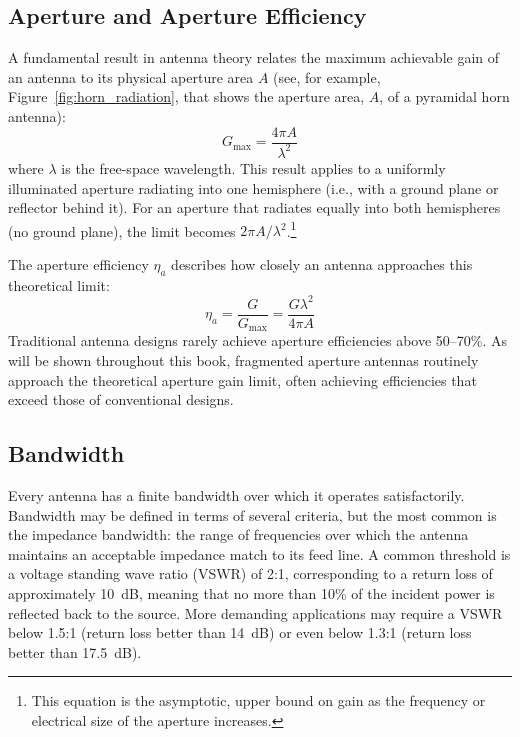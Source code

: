 \subsection{Aperture and Aperture Efficiency}

A fundamental result in antenna theory relates the maximum achievable gain of an antenna to its physical aperture area $A$ (see, for example, Figure~\ref{fig:horn_radiation}, that shows the aperture area, $A$, of a pyramidal horn antenna):
\begin{equation}
\label{eq:apGain}
G_{\text{max}} = \frac{4\pi A}{\lambda^2}
\end{equation}
where $\lambda$ is the free-space wavelength.  This result applies to a uniformly illuminated aperture radiating into one hemisphere (i.e., with a ground plane or reflector behind it).  For an aperture that radiates equally into both hemispheres (no ground plane), the limit becomes $2\pi A / \lambda^2$.\footnote{This equation is the asymptotic, upper bound on gain as the frequency or electrical size of the aperture increases.}

The aperture efficiency $\eta_a$ describes how closely an antenna approaches this theoretical limit:
\begin{equation}
\eta_a = \frac{G}{G_{\text{max}}} = \frac{G \lambda^2}{4\pi A}
\end{equation}
Traditional antenna designs rarely achieve aperture efficiencies above 50--70\%.  As will be shown throughout this book, fragmented aperture antennas routinely approach the theoretical aperture gain limit, often achieving efficiencies that exceed those of conventional designs.

\subsection{Bandwidth}

Every antenna has a finite bandwidth over which it operates satisfactorily.  Bandwidth may be defined in terms of several criteria, but the most common is the impedance bandwidth: the range of frequencies over which the antenna maintains an acceptable impedance match to its feed line.  A common threshold is a voltage standing wave ratio (VSWR) of 2:1, corresponding to a return loss of approximately 10~dB, meaning that no more than 10\% of the incident power is reflected back to the source.  More demanding applications may require a VSWR below 1.5:1 (return loss better than 14~dB) or even below 1.3:1 (return loss better than 17.5~dB).

